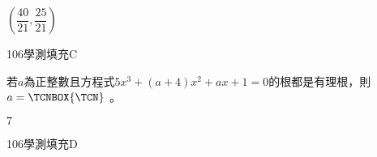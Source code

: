 \begin{QUESTIONS}
\begin{QUESTION}
\begin{QANS}
            $(\dfrac{40}{21},\dfrac{25}{21})$
        \end{QANS}
        \begin{QSOLLIST}
        \end{QSOLLIST}
        \begin{QEMPTYSPACE}
        \end{QEMPTYSPACE}
    \end{QUESTION}
    \begin{QUESTION}
        \begin{ExamInfo}{106}{學測}{填充}{C}
        \end{ExamInfo}
        \begin{ExamAnsRateInfo}{30}{63}{22}{5}
        \end{ExamAnsRateInfo}
        \begin{QBODY}
            若$a$為正整數且方程式$5{{x}^{3}}+(a+4){{x}^{2}}+ax+1=0$的根都是有理根，則$a= \TCNBOX{\TCN}$     。
        \end{QBODY}
        \begin{QFROMS}
        \end{QFROMS}
        \begin{QTAGS}\end{QTAGS}
        \begin{QANS}
            $7$
        \end{QANS}
        \begin{QSOLLIST}
        \end{QSOLLIST}
        \begin{QEMPTYSPACE}
        \end{QEMPTYSPACE}
    \end{QUESTION}
    \begin{QUESTION}
        \begin{ExamInfo}{106}{學測}{填充}{D}
        \end{ExamInfo}
        \begin{ExamAnsRateInfo}{37}{70}{33}{8}
        \end{ExamAnsRateInfo}
\end{QUESTION}
\end{QUESTIONS}

